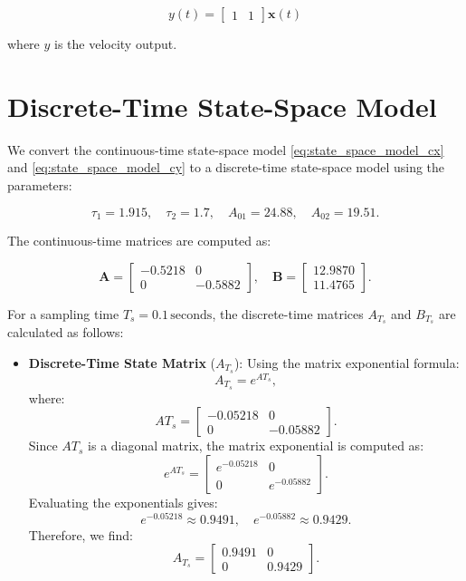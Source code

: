 \begin{equation}
    y(t) = \begin{bmatrix} 1 & 1 \end{bmatrix}\mathbf{x}(t)
    \label{eq:state_space_model_cy}
\end{equation}

where \( y \) is the velocity output.

\section{Discrete-Time State-Space Model}
We convert the continuous-time state-space model \eqref{eq:state_space_model_cx} and \eqref{eq:state_space_model_cy} to 
a discrete-time state-space model using the parameters:

\[
\tau_1 = 1.915, \quad \tau_2 = 1.7, \quad A_{01} = 24.88, \quad A_{02} = 19.51.
\]

The continuous-time matrices are computed as:

\[
\mathbf{A} = 
\begin{bmatrix}
-0.5218 & 0 \\
0 & -0.5882
\end{bmatrix}, \quad 
\mathbf{B} = 
\begin{bmatrix}
12.9870 \\
11.4765
\end{bmatrix}.
\]

For a sampling time \( T_s = 0.1 \, \text{seconds} \), the discrete-time matrices \( A_{T_s} \) and \( B_{T_s} \) are calculated as follows:

\begin{itemize}
    \item \textbf{Discrete-Time State Matrix} (\(A_{T_s}\)): 
   Using the matrix exponential formula:
   \[
   A_{T_s} = e^{A T_s},
   \]
   where:
   \[
   A T_s = 
   \begin{bmatrix}
   -0.05218 & 0 \\
   0 & -0.05882
   \end{bmatrix}.
   \]
   Since \( A T_s \) is a diagonal matrix, the matrix exponential is computed as:
   \[
   e^{A T_s} = 
   \begin{bmatrix}
   e^{-0.05218} & 0 \\
   0 & e^{-0.05882}
   \end{bmatrix}.
   \]
   Evaluating the exponentials gives:
   \[
   e^{-0.05218} \approx 0.9491, \quad e^{-0.05882} \approx 0.9429.
   \]
   Therefore, we find:
   \[
   A_{T_s} = 
   \begin{bmatrix}
   0.9491 & 0 \\
   0 & 0.9429
   \end{bmatrix}.
   \]
\end{itemize}

